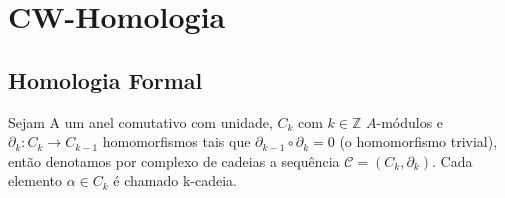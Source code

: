 \documentclass[twoside,openright,titlepage,numbers=noenddot,headinclude,  lineheaders footinclude=true,cleardoublepage=empty,
                                BCOR=5mm,paper=a4,fontsize=12pt ]{scrbook}
\begin{document}
\thispagestyle{empty}\newpage\mbox{}\thispagestyle{empty}\newpage\thispagestyle{empty} %
\frontmatter






%
%
%

%

%

%


%
\tableofcontents
%
\mainmatter





\chapter{CW-Homologia}
\section{Homologia Formal}
Sejam A um anel comutativo com unidade, $C_{k}$ com $k \in \mathbb{Z}$ $A$-módulos e $\partial_{k}: C_{k} \to C_{k-1} $ homomorfismos tais que $\partial_{k-1}\circ\partial_{k} = 0$ (o homomorfismo trivial), então denotamos por complexo de cadeias a sequência $\mathcal{C} = (C_{k}, \partial_{k})$. Cada elemento $\alpha \in C_{k}$ é chamado k-cadeia.
\end{document}

